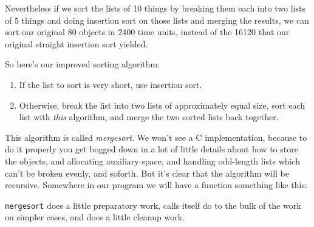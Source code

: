 Nevertheless if we sort the lists of 10 things by breaking them each
into two lists of 5 things and doing insertion sort on those lists and
merging the results, we can sort our original 80 objects in 2400 time
units, instead of the 16120 that our original straight insertion sort
yielded. 

So here's our improved sorting algorithm:

\begin{enumerate}
\item If the list to sort is very short, use insertion sort.
\item Otherwise, break the list into two lists of approximately equal
size, sort each list with {\em this}\/ algorithm, and merge the two
sorted lists back together.
\end{enumerate}

This algorithm is called {\em mergesort}\/.  We won't see a C
implementation, because to do it properly you get bogged down in a lot of
little details about how to store the objects, and allocating auxiliary
space, and handling odd-length lists which can't be broken evenly, and
soforth.  But it's clear that the algorithm will be recursive.
Somewhere in our program we will have a function something like this:

\begin{flushleft}
\verb% void mergesort(struct list *data, int length) % \\*
\verb% {% \\*
\verb%   ...% \\*
\verb%   if (length < SMALL_SIZE )  % \\*
\verb%     insertion_sort(data, length);% \\*
\verb%   else {% \\*
\verb%     split_list(data, top, bottom);% \\*
\verb%     mergesort(top,    length/2);% \\*
\verb%     mergesort(bottom, length/2);% \\*
\verb%     merge_lists(top, bottom, data);% \\*
\verb%     return;% \\*
\verb%   }% \\*
\verb% }% \\*
\end{flushleft}

{\tt mergesort} does a little preparatory work, calls itself do to the
bulk of the work on simpler cases, and does a little cleanup work.  

